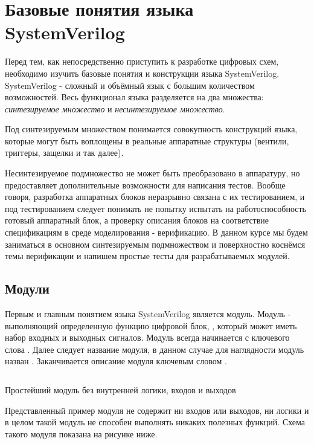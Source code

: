 \section{Базовые понятия языка SystemVerilog}
Перед тем, как непосредственно приступить к разработке цифровых схем, необходимо изучить базовые понятия и конструкции языка SystemVerilog.
SystemVerilog - сложный и объёмный язык с большим количеством возможностей. Весь функционал языка разделяется на два множества: \emph{синтезируемое множество} и \emph{несинтезируемое множество}.

Под синтезируемым множеством понимается совокупность конструкций языка, которые могут быть воплощены в реальные аппаратные структуры (вентили, триггеры, защелки и так далее). 

Несинтезируемое подмножество не может быть преобразовано в аппаратуру, но предоставляет дополнительные возможности для написания тестов.
Вообще говоря, разработка аппаратных блоков неразрывно связана с их тестированием, и под тестированием следует понимать не попытку испытать на работоспособность  готовый аппаратный блок, а проверку описания блоков на соответствие спецификациям в среде моделирования - верификацию. В данном курсе мы будем заниматься в основном синтезируемым подмножеством и поверхностно коснёмся темы верификации и напишем простые тесты для разрабатываемых модулей.

\subsection{Модули}

Первым и главным понятием языка SystemVerilog является модуль. Модуль - выполняющий определенную функцию цифровой блок, , который может иметь набор входных и выходных сигналов.
Модуль всегда начинается с ключевого слова . Далее следует название модуля, в данном случае для наглядности модуль назван . Заканчивается описание модуля ключевым словом .

\begin{listing}[H]
	\inputminted{SystemVerilog}{code_examples/lab_1/module_example_1.sv}
	\caption{Простейший модуль без внутренней логики, входов и выходов}
\end{listing}

Представленный пример модуля не содержит ни входов или выходов, ни логики и в целом такой модуль не способен выполнять никаких полезных функций. Схема такого модуля показана на рисунке ниже.


